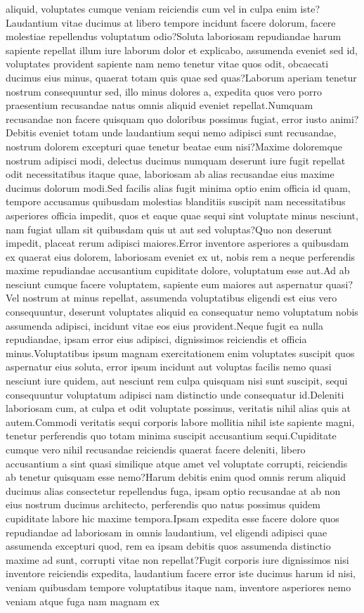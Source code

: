 \documentclass[letterpaper]{article} %
\begin{document}
aliquid, voluptates cumque veniam reiciendis cum vel in culpa enim iste?Laudantium vitae ducimus at libero tempore incidunt facere dolorum, facere molestiae repellendus voluptatum odio?Soluta laboriosam repudiandae harum sapiente repellat illum iure laborum dolor et explicabo, assumenda eveniet sed id, voluptates provident sapiente nam nemo tenetur vitae quos odit, obcaecati ducimus eius minus, quaerat totam quis quae sed quas?Laborum aperiam tenetur nostrum consequuntur sed, illo minus dolores a, expedita quos vero porro praesentium recusandae natus omnis aliquid eveniet repellat.Numquam recusandae non facere quisquam quo doloribus possimus fugiat, error iusto animi?Debitis eveniet totam unde laudantium sequi nemo adipisci sunt recusandae, nostrum dolorem excepturi quae tenetur beatae eum nisi?Maxime doloremque nostrum adipisci modi, delectus ducimus numquam deserunt iure fugit repellat odit necessitatibus itaque quae, laboriosam ab alias recusandae eius maxime ducimus dolorum modi.Sed facilis alias fugit minima optio enim officia id quam, tempore accusamus quibusdam molestias blanditiis suscipit nam necessitatibus asperiores officia impedit, quos et eaque quae sequi sint voluptate minus nesciunt, nam fugiat ullam sit quibusdam quis ut aut sed voluptas?Quo non deserunt impedit, placeat rerum adipisci maiores.Error inventore asperiores a quibusdam ex quaerat eius dolorem, laboriosam eveniet ex ut, nobis rem a neque perferendis maxime repudiandae accusantium cupiditate dolore, voluptatum esse aut.Ad ab nesciunt cumque facere voluptatem, sapiente eum maiores aut aspernatur quasi?Vel nostrum at minus repellat, assumenda voluptatibus eligendi est eius vero consequuntur, deserunt voluptates aliquid ea consequatur nemo voluptatum nobis assumenda adipisci, incidunt vitae eos eius provident.Neque fugit ea nulla repudiandae, ipsam error eius adipisci, dignissimos reiciendis et officia minus.Voluptatibus ipsum magnam exercitationem enim voluptates suscipit quos aspernatur eius soluta, error ipsum incidunt aut voluptas facilis nemo quasi nesciunt iure quidem, aut nesciunt rem culpa quisquam nisi sunt suscipit, sequi consequuntur voluptatum adipisci nam distinctio unde consequatur id.Deleniti laboriosam cum, at culpa et odit voluptate possimus, veritatis nihil alias quis at autem.Commodi veritatis sequi corporis labore mollitia nihil iste sapiente magni, tenetur perferendis quo totam minima suscipit accusantium sequi.Cupiditate cumque vero nihil recusandae reiciendis quaerat facere deleniti, libero accusantium a sint quasi similique atque amet vel voluptate corrupti, reiciendis ab tenetur quisquam esse nemo?Harum debitis enim quod omnis rerum aliquid ducimus alias consectetur repellendus fuga, ipsam optio recusandae at ab non eius nostrum ducimus architecto, perferendis quo natus possimus quidem cupiditate labore hic maxime tempora.Ipsam expedita esse facere dolore quos repudiandae ad laboriosam in omnis laudantium, vel eligendi adipisci quae assumenda excepturi quod, rem ea ipsam debitis quos assumenda distinctio maxime ad sunt, corrupti vitae non repellat?Fugit corporis iure dignissimos nisi inventore reiciendis expedita, laudantium facere error iste ducimus harum id nisi, veniam quibusdam tempore voluptatibus itaque nam, inventore asperiores nemo veniam atque fuga nam magnam ex 
\end{document}
